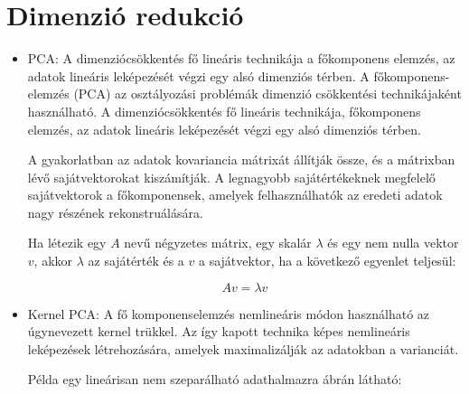 \section{Dimenzió redukció}
\begin{itemize}
\item PCA: A dimenziócsökkentés\cite{wang2003feature} fő lineáris technikája a főkomponens elemzés, az adatok lineáris leképezését végzi egy alsó dimenziós térben. A főkomponens-elemzés (PCA) az osztályozási problémák dimenzió csökkentési technikájaként használható. A dimenziócsökkentés fő lineáris technikája, főkomponens elemzés, az adatok lineáris leképezését végzi egy alsó dimenziós térben.

A gyakorlatban az adatok kovariancia mátrixát állítják össze, és a mátrixban lévő sajátvektorokat kiszámítják. A legnagyobb sajátértékeknek megfelelő sajátvektorok a főkomponensek, amelyek felhasználhatók az eredeti adatok nagy részének rekonstruálására.

Ha létezik egy $A$ nevű négyzetes mátrix, egy skalár $\lambda$ és egy nem nulla vektor $v$, akkor $\lambda$ az sajátérték és a $v$ a sajátvektor, ha a következő egyenlet teljesül:

$$
Av = \lambda v
$$

\item Kernel PCA: A fő komponenselemzés nemlineáris módon használható az úgynevezett kernel trükkel. Az így kapott technika képes nemlineáris leképezések létrehozására, amelyek maximalizálják az adatokban a varianciát.

Példa egy lineárisan nem szeparálható adathalmazra  ábrán látható:


\end{itemize}
